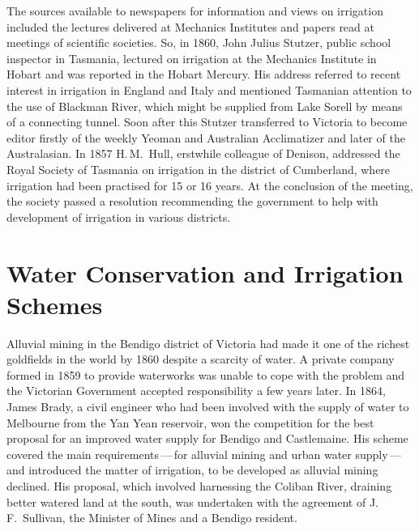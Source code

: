 The sources available to newspapers for information and views on
irrigation included the lectures delivered at Mechanics Institutes and
papers read at meetings of scientific societies.  So, in 1860, John
Julius Stutzer, public school inspector in Tasmania, lectured on
irrigation at the Mechanics Institute in Hobart and was reported in
the Hobart Mercury. His address referred to recent interest in
irrigation in England and Italy and mentioned Tasmanian attention to
the use of Blackman River, which might be supplied from Lake Sorell by
means of a connecting tunnel.  Soon after this Stutzer transferred to
Victoria to become editor firstly of the weekly Yeoman and Australian
Acclimatizer and later of the Australasian.  In 1857 H.\,M.~Hull,
erstwhile colleague of Denison, addressed the Royal Society of
Tasmania on irrigation in the district of Cumberland, where irrigation
had been practised for 15 or 16 years.  At the conclusion of the
meeting, the society passed a resolution recommending the government
to help with development of irrigation in various
districts.

\section*{Water Conservation and Irrigation Schemes}

Alluvial mining in the Bendigo district of Victoria had made it one of
the richest goldfields in the world by 1860 despite a scarcity of
water.  A private company formed in 1859 to provide waterworks was
unable to cope with the problem and the Victorian Government accepted
responsibility a few years later.  In 1864, James Brady, a civil
engineer who had been involved with the supply of water to Melbourne
from the Yan Yean reservoir, won the competition for the best proposal
for an improved water supply for Bendigo and Castlemaine. His scheme
covered the main requirements\,---\,for alluvial mining and urban water
supply\,---\,and introduced the matter of irrigation, to be developed as
alluvial mining declined.  His proposal, which involved harnessing the
Coliban River, draining better watered land at the south, was
undertaken with the agreement of J.\,F.~Sullivan, the Minister of
Mines and a Bendigo resident.

